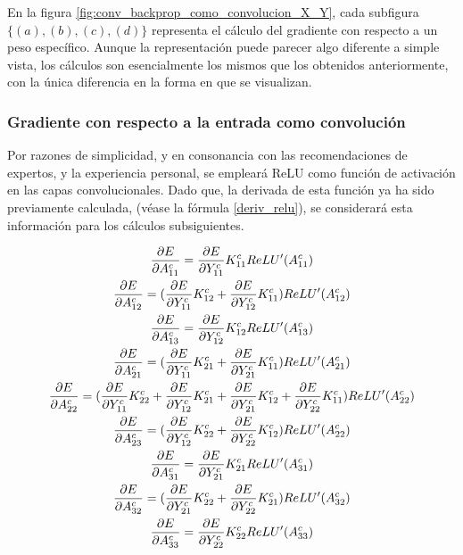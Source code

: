 En la figura \ref{fig:conv_backprop_como_convolucion_X_Y}, cada subfigura $\{(a), (b), (c), (d)\}$ representa el cálculo del gradiente con respecto a un peso específico. Aunque la representación puede parecer algo diferente a simple vista, los cálculos son esencialmente los mismos que los obtenidos anteriormente, con la única diferencia en la forma en que se visualizan.

\subsubsection{Gradiente con respecto a la entrada como convolución}

Por razones de simplicidad, y en consonancia con las recomendaciones de expertos, y la experiencia personal, se empleará ReLU como función de activación en las capas convolucionales. Dado que, la derivada de esta función ya ha sido previamente calculada, (véase la fórmula \ref{deriv_relu}), se considerará esta información para los cálculos subsiguientes.


\begin{gather}
	\frac{\partial E}{\partial A^c_{11}} = \frac{\partial E}{\partial Y^c_{11}} K^c_{11} ReLU'(A^c_{11}) \notag \\
	\frac{\partial E}{\partial A^c_{12}} = (\frac{\partial E}{\partial Y^c_{11}} K^c_{12} + \frac{\partial E}{\partial Y^c_{12}} K^c_{11}) ReLU'(A^c_{12}) \notag \\
	\frac{\partial E}{\partial A^c_{13}} = \frac{\partial E}{\partial Y^c_{12}} K^c_{12} ReLU'(A^c_{13}) \notag \\
	\frac{\partial E}{\partial A^c_{21}} = (\frac{\partial E}{\partial Y^c_{11}} K^c_{21} + \frac{\partial E}{\partial Y^c_{21}} K^c_{11}) ReLU'(A^c_{21}) \notag \\
	\frac{\partial E}{\partial A^c_{22}} = (\frac{\partial E}{\partial Y^c_{11}} K^c_{22} + \frac{\partial E}{\partial Y^c_{12}} K^c_{21} + \frac{\partial E}{\partial Y^c_{21}} K^c_{12} + \frac{\partial E}{\partial Y^c_{22}} K^c_{11}) ReLU'(A^c_{22}) \notag \\
	\frac{\partial E}{\partial A^c_{23}} = (\frac{\partial E}{\partial Y^c_{12}} K^c_{22} + \frac{\partial E}{\partial Y^c_{22}} K^c_{12}) ReLU'(A^c_{22})\notag \\
	\frac{\partial E}{\partial A^c_{31}} = \frac{\partial E}{\partial Y^c_{21}} K^c_{21} ReLU'(A^c_{31})\notag \\
	\frac{\partial E}{\partial A^c_{32}} = (\frac{\partial E}{\partial Y^c_{21}} K^c_{22} + \frac{\partial E}{\partial Y^c_{22}} K^c_{21}) ReLU'(A^c_{32}) \notag \\
	\frac{\partial E}{\partial A^c_{33}} = \frac{\partial E}{\partial Y^c_{22}} K^c_{22} ReLU'(A^c_{33}) \notag
\end{gather}

